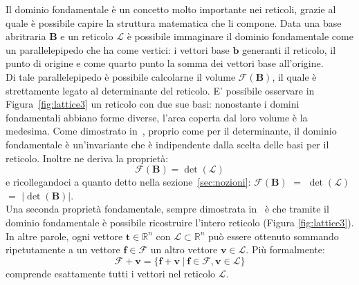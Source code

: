 Il dominio fondamentale è un concetto molto importante nei reticoli, grazie al quale è possibile
capire la struttura matematica che li compone. Data una base abritraria $\mathbf{B}$ e un reticolo 
$\mathcal{L}$ è possibile immaginare il dominio fondamentale come un parallelepipedo 
che ha come vertici: i vettori base $\mathbf{b}$ generanti il reticolo, il punto di origine e 
come quarto punto la somma dei vettori base all'origine. \\
Di tale parallelepipedo è possibile calcolarne il volume $\mathcal{F}(\mathbf{B})$, il 
quale è strettamente legato al determinante del reticolo. 
E' possibile osservare in Figura~\ref{fig:lattice3} un reticolo con due sue basi: nonostante 
i domini fondamentali abbiano forme diverse, l'area coperta dal loro volume è la medesima.
Come dimostrato in~\cite[Sezione 7.4]{HDMRD08}, proprio come per il
determinante, il dominio fondamentale è un'invariante che è indipendente dalla scelta 
delle basi per il reticolo. Inoltre ne deriva la proprietà:
\[
    \mathcal{F}(\mathbf{B}) = \det(\mathcal{L})
\]
e ricollegandoci a quanto detto nella sezione~\ref{sec:nozioni}: 
$\mathcal{F}(\mathbf{B})$ $=$ $\det(\mathcal{L})$ $=$ $|\det(\mathbf{B})|$.\\
Una seconda proprietà fondamentale, sempre dimostrata in~\cite{HDMRD08} è che tramite il
dominio fondamentale è possibile ricostruire l'intero reticolo (Figura \ref{fig:lattice3}). 
In altre parole, ogni vettore $\mathbf{t} \in \mathbb{R}^n$ con $\mathcal{L} \subset \mathbb{R}^n $ 
può essere ottenuto sommando ripetutamente a un vettore $\mathbf{f} \in \mathcal{F}$ un 
altro vettore $\mathbf{v} \in \mathcal{L}$.
Più formalmente: 
\[
    \mathcal{F} + \mathbf{v} = 
\{ 
    \mathbf{f} + \mathbf{v} \ | \ \mathbf{f} \in \mathcal{F}, \mathbf{v} \in \mathcal{L}
\} 
\]
comprende esattamente tutti i vettori nel reticolo $\mathcal{L}$.

